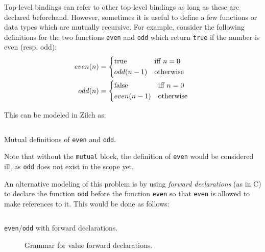Top-level bindings can refer to other top-level bindings as long as these are declared beforehand.
However, sometimes it is useful to define a few functions or data types which are mutually recursive.
For example, consider the following definitions for the two functions \texttt{even} and \texttt{odd} which return \texttt{true} if the number is even (resp. odd):
\begin{align*}
	even(n) & = \begin{cases*}
		            \mathrm{true} & iff $n = 0$ \\
		            odd(n - 1)    & otherwise
	            \end{cases*}  \\
	odd(n)  & = \begin{cases*}
		            \mathrm{false} & iff $n = 0$ \\
		            even(n - 1)    & otherwise
	            \end{cases*}
\end{align*}

This can be modeled in Zilch as:
\begin{listing}[H]
	\inputminted{\zilchlexer}{examples/mutual-even-odd.zc}

	\captionsetup{style=invisible}
	\caption{Mutual definitions of \texttt{even} and \texttt{odd}.}
\end{listing}\vspace*{-\baselineskip}
Note that without the \texttt{mutual} block, the definition of \texttt{even} would be considered ill, as \texttt{odd} does not exist in the scope yet.

An alternative modeling of this problem is by using \textit{forward declarations} (as in C) to declare the function \texttt{odd} before the function \texttt{even} so that \texttt{even} is allowed to make references to it.
This would be done as follows:
\begin{listing}[H]
	\inputminted{\zilchlexer}{examples/forwarddecls-even-odd.zc}

	\captionsetup{style=invisible}
	\caption{\texttt{even}/\texttt{odd} with forward declarations.}
\end{listing}
\vspace*{-\baselineskip}

\begin{figure}[H]
	\centering


	\caption{Grammar for value forward declarations.}
	\label{fig:zilch-grammar-declarations-mutual-forwarddecls-grammar}
\end{figure}


